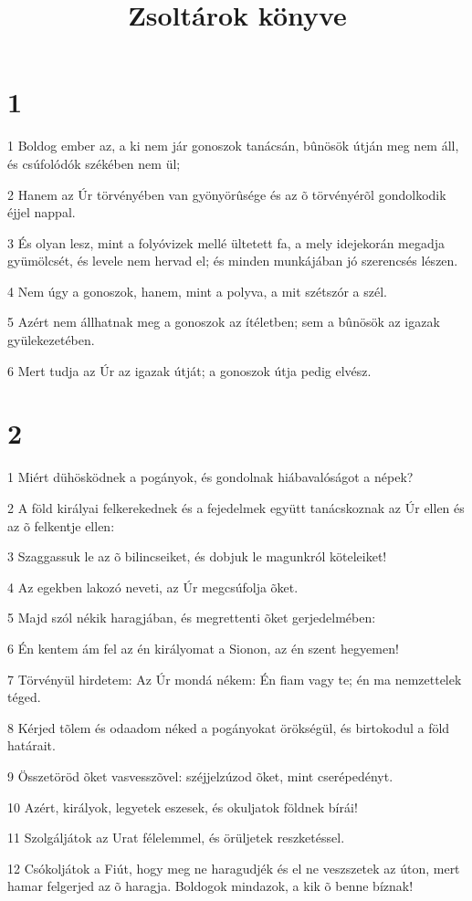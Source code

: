 

\title{Zsoltárok könyve}


\chapter{1}

\par 1 Boldog ember az, a ki nem jár gonoszok tanácsán, bûnösök útján meg nem áll, és csúfolódók székében nem ül;
\par 2 Hanem az Úr törvényében van gyönyörûsége és az õ törvényérõl gondolkodik éjjel nappal.
\par 3 És olyan lesz, mint a folyóvizek mellé ültetett fa, a mely idejekorán megadja gyümölcsét, és levele nem hervad el; és minden munkájában jó szerencsés lészen.
\par 4 Nem úgy a gonoszok, hanem, mint a polyva, a mit szétszór a szél.
\par 5 Azért nem állhatnak meg a gonoszok az ítéletben; sem a bûnösök az igazak gyülekezetében.
\par 6 Mert tudja az Úr az igazak útját; a gonoszok útja pedig elvész.

\chapter{2}

\par 1 Miért dühösködnek a pogányok, és gondolnak hiábavalóságot a népek?
\par 2 A föld királyai felkerekednek és a fejedelmek együtt tanácskoznak az Úr ellen és az õ felkentje ellen:
\par 3 Szaggassuk le az õ bilincseiket, és dobjuk le magunkról köteleiket!
\par 4 Az egekben lakozó neveti, az Úr megcsúfolja õket.
\par 5 Majd szól nékik haragjában, és megrettenti õket gerjedelmében:
\par 6 Én kentem ám fel az én királyomat a Sionon, az én szent hegyemen!
\par 7 Törvényül hirdetem: Az Úr mondá nékem: Én fiam vagy te; én ma nemzettelek téged.
\par 8 Kérjed tõlem és odaadom néked a pogányokat örökségül, és birtokodul a föld határait.
\par 9 Összetöröd õket vasvesszõvel: széjjelzúzod õket, mint cserépedényt.
\par 10 Azért, királyok, legyetek eszesek, és okuljatok földnek bírái!
\par 11 Szolgáljátok az Urat félelemmel, és örüljetek reszketéssel.
\par 12 Csókoljátok a Fiút, hogy meg ne haragudjék és el ne veszszetek az úton, mert hamar felgerjed az õ haragja. Boldogok mindazok, a kik õ benne bíznak!

